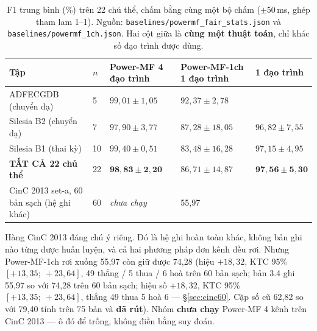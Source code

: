 \begin{table}[H]\centering\small
\caption{F1 trung bình (\%) trên 22 chủ thể, chấm bằng cùng một bộ chấm ($\pm$50\,ms, ghép tham lam
1--1). Nguồn: \texttt{baselines/powermf\_fair\_stats.json} và \texttt{baselines/powermf\_1ch.json}.
Hai cột giữa là \textbf{cùng một thuật toán}, chỉ khác số đạo trình được dùng.}
\label{tab:pmf_bacot}
\begin{tabular}{@{}L{4.4cm} C{0.8cm} C{3.0cm} C{3.0cm} C{3.0cm}@{}}
\toprule
\textbf{Tập} & $n$ & \textbf{Power-MF} \newline \textbf{4 đạo trình} &
\textbf{Power-MF-1ch} \newline \textbf{1 đạo trình} &
\textbf{\hethong{}} \newline \textbf{1 đạo trình} \\
\midrule
ADFECGDB (chuyển dạ) & 5 & $99{,}01 \pm 1{,}05$ & $92{,}37 \pm 2{,}78$ &  \\
Silesia B2 (chuyển dạ) & 7 & $97{,}90 \pm 3{,}77$ & $87{,}28 \pm 18{,}05$ & $96{,}82 \pm 7{,}55$ \\
Silesia B1 (thai kỳ) & 10 & $99{,}40 \pm 0{,}51$ & $83{,}48 \pm 16{,}28$ & $97{,}15 \pm 4{,}95$ \\
\midrule
\textbf{TẤT CẢ 22 chủ thể} & 22 & $\mathbf{98{,}83 \pm 2{,}20}$ & $86{,}71 \pm 14{,}87$ &
$\mathbf{97{,}56 \pm 5{,}30}$ \\
\midrule
CinC 2013 set-a, 60 bản sạch (hệ ghi khác) & 60 & \textit{chưa chạy} & 55,97 &  \\
\bottomrule
\end{tabular}
\end{table}

Hàng CinC 2013 đáng chú ý riêng. Đó là hệ ghi hoàn toàn khác, không bản ghi nào từng được huấn luyện, và
cả hai phương pháp đơn kênh đều rơi. Nhưng Power-MF-1ch rơi xuống 55,97 còn \hethong{} giữ được 74,28
(hiệu $+18{,}32$, KTC 95\% $[+13{,}35;\ +23{,}64]$, 49 thắng / 5 thua / 6 hoà trên 60 bản sạch; bản 3.4 ghi
55,97 so với 74,28 trên 60 bản sạch; hiệu số $+18{,}32$, KTC 95\% $[+13{,}35;\ +23{,}64]$,
thắng 49 thua 5 hoà 6 --- \S\ref{sec:cinc60}. Cặp số cũ 62,82 so với 79,40 tính trên 75 bản
và \textbf{đã rút}).
Nhóm \textbf{chưa chạy} Power-MF 4 kênh trên CinC 2013 --- ô đó để trống, không điền bằng suy đoán.

